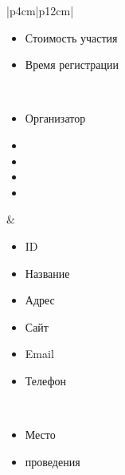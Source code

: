 \begin{table}[h!]
\begin{center}
\begin{threeparttable}
\begin{tabular}{|p{4cm}|p{12cm}|}
\begin{minipage}[t]{\linewidth}
\begin{multicols}{2}
\begin{itemize}[leftmargin=0mm,labelsep=0mm,nosep,after=\strut]
                  \item[] Стоимость участия
                  \item[] Время регистрации
                \end{itemize}
              \end{multicols}
            \end{minipage}\\
            \hline
            \begin{minipage}[t]{\linewidth}
              \begin{multicols}{1}
                \begin{itemize}[leftmargin=0mm,labelsep=0mm,nosep,after=\strut]
                  \item[] Организатор
                  \item[]
                  \item[]
                  \item[]
                  \item[]
                \end{itemize}
              \end{multicols}
            \end{minipage}
          & \begin{minipage}[t]{\linewidth}
              \begin{multicols}{2}
                \begin{itemize}[leftmargin=0mm,labelsep=0mm,nosep,after=\strut]
                  \item[] ID
                  \item[] Название
                  \item[] Адрес
                  \item[] Сайт
                  \item[] Email
                  \item[] Телефон
                \end{itemize}
              \end{multicols}
            \end{minipage}\\
            \hline
            \begin{minipage}[t]{\linewidth}
              \begin{multicols}{1}
                \begin{itemize}[leftmargin=0mm,labelsep=0mm,nosep,after=\strut]
                  \item[] Место 
                  \item[] проведения

\end{itemize}
\end{multicols}
\end{minipage}
\end{tabular}
\end{threeparttable}
\end{center}
\end{table}
